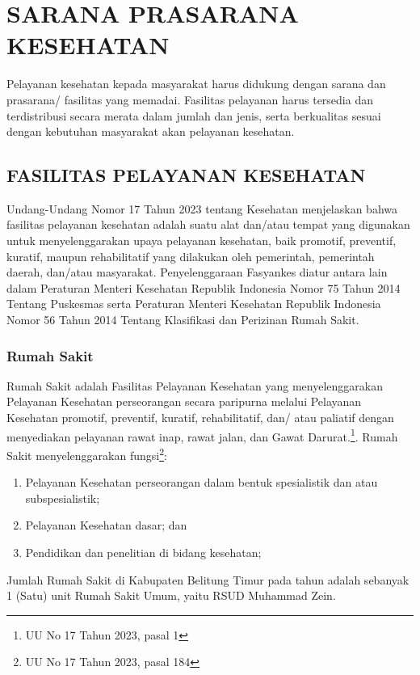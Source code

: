 \chapter{SARANA PRASARANA KESEHATAN}

Pelayanan kesehatan kepada masyarakat harus didukung dengan sarana dan prasarana/ fasilitas yang memadai. Fasilitas pelayanan harus tersedia dan terdistribusi secara merata dalam jumlah dan jenis, serta berkualitas sesuai dengan kebutuhan masyarakat akan pelayanan kesehatan. 

\section{FASILITAS PELAYANAN KESEHATAN}
Undang-Undang Nomor 17 Tahun 2023 tentang Kesehatan menjelaskan bahwa fasilitas pelayanan kesehatan adalah suatu alat dan/atau tempat yang digunakan untuk menyelenggarakan upaya pelayanan kesehatan, baik promotif, preventif, kuratif, maupun rehabilitatif yang dilakukan oleh pemerintah, pemerintah daerah, dan/atau masyarakat. Penyelenggaraan Fasyankes diatur antara lain dalam Peraturan Menteri Kesehatan Republik Indonesia Nomor 75 Tahun 2014 Tentang Puskesmas serta Peraturan Menteri Kesehatan Republik Indonesia Nomor 56 Tahun 2014 Tentang Klasifikasi dan Perizinan Rumah Sakit.

\subsection{Rumah Sakit}
Rumah Sakit adalah Fasilitas Pelayanan Kesehatan yang menyelenggarakan Pelayanan Kesehatan perseorangan secara paripurna melalui Pelayanan Kesehatan promotif, preventif, kuratif, rehabilitatif, dan/ atau paliatif dengan menyediakan pelayanan rawat inap, rawat jalan, dan Gawat Darurat.\footnote{UU No 17 Tahun 2023, pasal 1}. Rumah Sakit menyelenggarakan fungsi\footnote{UU No 17 Tahun 2023, pasal 184}:
\begin{enumerate}
  \item Pelayanan Kesehatan perseorangan dalam bentuk spesialistik dan atau subspesialistik;
  \item Pelayanan Kesehatan dasar; dan
  \item Pendidikan dan penelitian di bidang kesehatan;
\end{enumerate}

Jumlah Rumah Sakit di Kabupaten Belitung Timur pada tahun \tP adalah sebanyak 1 (Satu) unit Rumah Sakit Umum, yaitu RSUD Muhammad Zein.

